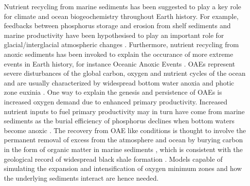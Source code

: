 \documentclass[gmd, manuscript]{copernicus}
\begin{document}
Nutrient recycling from marine sediments has been suggested to play a key role for climate and ocean biogeochemistry throughout Earth history. 
For example, feedbacks between phosphorus storage and erosion from shelf sediments and marine productivity have been hypothesised to play an important role for glacial/interglacial atmospheric  changes \citep{broecker_ocean_1982, ruttenberg_reassessment_1993}. 
Furthermore, nutrient recycling from anoxic sediments has been invoked to explain the occurance of more extreme events in Earth history, for instance Oceanic Anoxic Events %
\citep[OAEs, e.g.][]{mort_phosphorus_2007, tsandev_modeling_2009}. OAEs represent severe disturbances of the global carbon, oxygen and nutrient cycles of the ocean and are usually characterized 
by widespread bottom water anoxia and photic zone euxinia \citep{jenkyns_geochemistry_2010}. 
One way to explain the genesis and persistence of OAEs is increased oxygen demand due to enhanced primary productivity. Increased nutrient inputs to fuel primary productivity may in turn have come from marine sediments as the 
burial efficiency of phosphorus declines when bottom waters become anoxic \citep{ingall_evidence_1994, van_cappellen_benthic_1994}. 
The recovery from OAE like conditions is thought to involve the permanent removal of excess  from the atmosphere and ocean by burying carbon in the form of organic matter in marine sediments 
\citep[e.g.][]{arthur_geochemical_1988, jarvis_black_2011}, which is consistent with the geological record of widespread black shale formation \citep{stein_accumulation_1986}. 
Models capable of simulating the expansion and intensification of oxygen minimum zones and how the underlying sediments interact are hence needed. 

\end{document}
